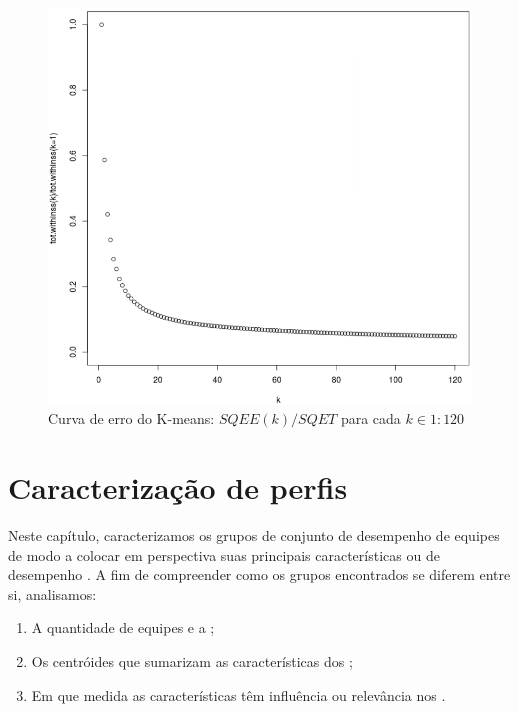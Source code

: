 \begin{figure}
  \centering
  \includegraphics[width=1.0\textwidth]{k-means-curve}%
  \caption{Curva de erro do K-means: $SQEE(k)/SQET$   para cada $k \in {1:120}$}
  \label{fig:k-means-curve}
\end{figure}

\chapter{Caracterização de perfis}
Neste capítulo, caracterizamos  os grupos de conjunto de desempenho de equipes de modo a colocar em perspectiva suas principais características ou  de desempenho . A fim de compreender como os grupos  encontrados se diferem entre si, analisamos:

\begin{enumerate}[label=(\roman*)]
 \item A quantidade de equipes e a ;
 \item Os centróides que sumarizam as características dos ;
 \item Em que medida as características têm influência ou relevância nos .
\end{enumerate}

